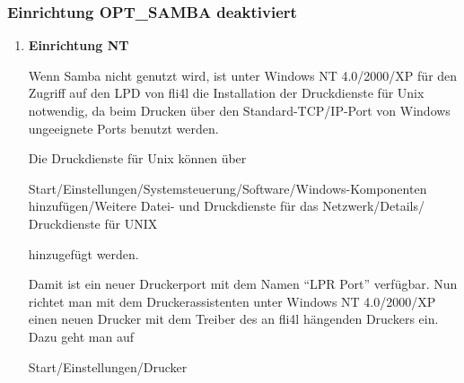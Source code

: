 \subsubsection{Einrichtung OPT\_SAMBA deaktiviert}
\begin{enumerate}
\item \textbf{Einrichtung NT}

    Wenn Samba nicht genutzt wird, ist unter Windows NT 4.0/2000/XP für den
    Zugriff auf den LPD von fli4l die Installation der Druckdienste für Unix
    notwendig, da beim Drucken über den Standard-TCP/IP-Port von Windows
    ungeeignete Ports benutzt werden.

    Die Druckdienste für Unix können über

    Start/Einstellungen/Systemsteuerung/Software/Windows-Komponenten
    hinzufügen/Weitere Datei- und Druckdienste für das Netzwerk/Details/
    Druckdienste für UNIX

    hinzugefügt werden.

    Damit ist ein neuer Druckerport mit dem Namen ``LPR Port'' verfügbar. Nun
    richtet man mit dem Druckerassistenten unter Windows NT 4.0/2000/XP einen
    neuen Drucker mit dem Treiber des an fli4l hängenden Druckers ein. Dazu
    geht man auf

    Start/Einstellungen/Drucker


\end{enumerate}
